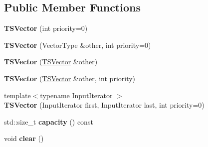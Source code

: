 \subsection*{Public Member Functions}
\begin{DoxyCompactItemize}
\item 
\hypertarget{classcore_1_1threading_1_1container_1_1_t_s_vector_a287174242f0a11c1cce234baa8d09311}{{\bfseries T\-S\-Vector} (int priority=0)}\label{classcore_1_1threading_1_1container_1_1_t_s_vector_a287174242f0a11c1cce234baa8d09311}

\item 
\hypertarget{classcore_1_1threading_1_1container_1_1_t_s_vector_aba61b7eb2d8e705ce58e132ec4ab4e57}{{\bfseries T\-S\-Vector} (Vector\-Type \&other, int priority=0)}\label{classcore_1_1threading_1_1container_1_1_t_s_vector_aba61b7eb2d8e705ce58e132ec4ab4e57}

\item 
\hypertarget{classcore_1_1threading_1_1container_1_1_t_s_vector_a84dcaa8abe559f911f965f33984c36a9}{{\bfseries T\-S\-Vector} (\hyperlink{classcore_1_1threading_1_1container_1_1_t_s_vector}{T\-S\-Vector} \&other)}\label{classcore_1_1threading_1_1container_1_1_t_s_vector_a84dcaa8abe559f911f965f33984c36a9}

\item 
\hypertarget{classcore_1_1threading_1_1container_1_1_t_s_vector_a4bcd25bac6a77ec3e844052dfac60fb7}{{\bfseries T\-S\-Vector} (\hyperlink{classcore_1_1threading_1_1container_1_1_t_s_vector}{T\-S\-Vector} \&other, int priority)}\label{classcore_1_1threading_1_1container_1_1_t_s_vector_a4bcd25bac6a77ec3e844052dfac60fb7}

\item 
\hypertarget{classcore_1_1threading_1_1container_1_1_t_s_vector_acd9488804cae05d98446995dde29a87e}{{\footnotesize template$<$typename Input\-Iterator $>$ }\\{\bfseries T\-S\-Vector} (Input\-Iterator first, Input\-Iterator last, int priority=0)}\label{classcore_1_1threading_1_1container_1_1_t_s_vector_acd9488804cae05d98446995dde29a87e}

\item 
\hypertarget{classcore_1_1threading_1_1container_1_1_t_s_vector_a02cceafb11b4b33db8ce0aebeb065f40}{std\-::size\-\_\-t {\bfseries capacity} () const }\label{classcore_1_1threading_1_1container_1_1_t_s_vector_a02cceafb11b4b33db8ce0aebeb065f40}

\item 
\hypertarget{classcore_1_1threading_1_1container_1_1_t_s_vector_a41008189bd6119281de700c2dc44d857}{void {\bfseries clear} ()}\label{classcore_1_1threading_1_1container_1_1_t_s_vector_a41008189bd6119281de700c2dc44d857}


\end{DoxyCompactItemize}
